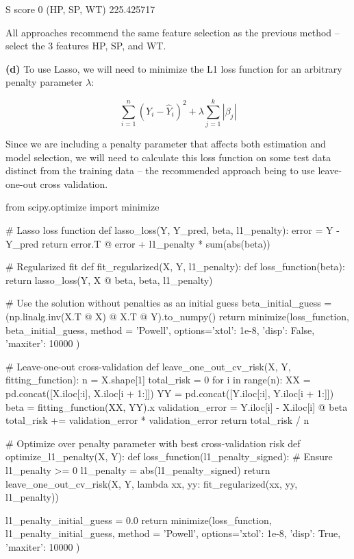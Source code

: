 \begin{console}
              S       score
0  (HP, SP, WT)  225.425717
\end{console}

All approaches recommend the same feature selection as the previous
method -- select the 3 features HP, SP, and WT.

\textbf{(d)} To use Lasso, we will need to minimize the L1 loss function
for an arbitrary penalty parameter \(\lambda\):

\[ \sum_{i=1}^{n} (Y_{i} - \hat{Y}_{i})^{2} + \lambda \sum_{j=1}^{k} | \beta_{j} | \]

Since we are including a penalty parameter that affects both estimation
and model selection, we will need to calculate this loss function on
some test data distinct from the training data -- the recommended
approach being to use leave-one-out cross validation.

\begin{python}
from scipy.optimize import minimize

# Lasso loss function
def lasso_loss(Y, Y_pred, beta, l1_penalty):
    error = Y - Y_pred
    return error.T @ error + l1_penalty * sum(abs(beta))

# Regularized fit
def fit_regularized(X, Y, l1_penalty):
    def loss_function(beta):
        return lasso_loss(Y, X @ beta, beta, l1_penalty)
    
    # Use the solution without penalties as an initial guess
    beta_{i}nitial_guess = (np.linalg.inv(X.T @ X) @ X.T @ Y).to_{n}umpy()
    return minimize(loss_function, beta_{i}nitial_guess, method = 'Powell',
                    options={'xtol': 1e-8, 'disp': False, 'maxiter': 10000 }) 

# Leave-one-out cross-validation
def leave_one_out_cv_risk(X, Y, fitting_function):
    n = X.shape[1]
    total_risk = 0
    for i in range(n):
        XX = pd.concat([X.iloc[:i], X.iloc[i + 1:]])
        YY = pd.concat([Y.iloc[:i], Y.iloc[i + 1:]])
        beta = fitting_function(XX, YY).x
        validation_error = Y.iloc[i] - X.iloc[i] @ beta
        total_risk += validation_error * validation_error
    return total_risk / n

# Optimize over penalty parameter with best cross-validation risk
def optimize_l1_penalty(X, Y):
    def loss_function(l1_penalty_signed):
        # Ensure l1_penalty >= 0
        l1_penalty = abs(l1_penalty_signed)
        return leave_one_out_cv_risk(X, Y, lambda xx, yy: fit_regularized(xx, yy, l1_penalty))
    
    l1_penalty_{i}nitial_guess = 0.0
    return minimize(loss_function, l1_penalty_{i}nitial_guess, method = 'Powell',
                   options={'xtol': 1e-8, 'disp': True, 'maxiter': 10000 })
\end{python}

